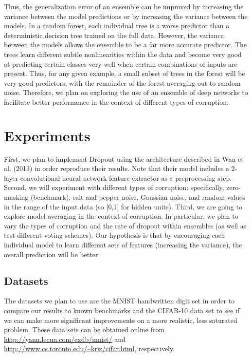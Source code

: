 \documentclass{article} %
\begin{document}
Thus, the generalization error of an ensemble can be improved by increasing the variance between the model predictions or by increasing the variance between the models. In a random forest, each individual tree is a worse predictor than a deterministic decision tree trained on the full data. However, the variance between the models allows the ensemble to be a far more accurate predictor. The trees learn different subtle nonlinearities within the data and become very good at predicting certain classes very well when certain combinations of inputs are present. Thus, for any given example, a small subset of trees in the forest will be very good predictors, with the remainder of the forest averaging out to random noise. Therefore, we plan on exploring the use of an ensemble of deep networks to facilitate better performance in the context of different types of corruption.

\section{Experiments}

First, we plan to implement Dropout using the architecture described in Wan et al. (2013) in order reproduce their results. Note that their model includes a 2-layer convolutional neural network feature extractor as a preprocessing step. Second, we will experiment with different types of corruption: specifically, zero-masking (benchmark), salt-and-pepper noise, Gaussian noise, and random values in the range of the input data (so [0,1] for hidden units). Third, we are going to explore model averaging in the context of corruption. In particular, we plan to vary the types of corruption and the rate of dropout within ensembles (as well as test different voting schemes). Our hypothesis is that by encouraging each individual model to learn different sets of features (increasing the variance), the overall prediction will be better.

\subsection{Datasets}

The datasets we plan to use are the MNIST handwritten digit set in order to compare our results to known benchmarks and the CIFAR-10 data set to see if we can make more significant improvements on a more realistic, less saturated problem. These data sets can be obtained online from \url{http://yann.lecun.com/exdb/mnist/} and \url{http://www.cs.toronto.edu/~kriz/cifar.html}, respectively.
\end{document}
